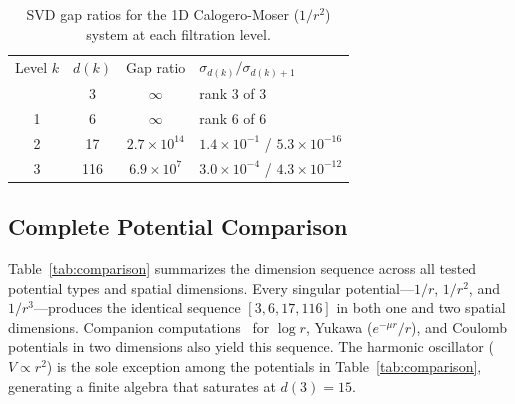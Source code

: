 \documentclass[aps,prl,twocolumn,superscriptaddress,showpacs]{revtex4-2}
\begin{document}
\begin{table}[b]
\caption{SVD gap ratios for the 1D Calogero-Moser ($1/r^2$) system
at each filtration level.}
\label{tab:gaps}
\begin{ruledtabular}
\begin{tabular}{cccl}
Level $k$ & $d(k)$ & Gap ratio & $\sigma_{d(k)} / \sigma_{d(k)+1}$ \\
\colrule
0 & 3  & $\infty$       & rank 3 of 3 \\
1 & 6  & $\infty$       & rank 6 of 6 \\
2 & 17 & $2.7 \times 10^{14}$ & $1.4 \times 10^{-1}$ / $5.3 \times 10^{-16}$ \\
3 & 116 & $6.9 \times 10^{7}$ & $3.0 \times 10^{-4}$ / $4.3 \times 10^{-12}$ \\
\end{tabular}
\end{ruledtabular}
\end{table}

\subsection{Complete Potential Comparison}

Table~\ref{tab:comparison} summarizes the dimension sequence across
all tested potential types and spatial dimensions.  Every singular
potential---$1/r$, $1/r^2$, and $1/r^3$---produces the identical
sequence $[3, 6, 17, 116]$ in both one and two spatial dimensions.
Companion computations~\cite{paper1,paper3} for $\log r$, Yukawa
($e^{-\mu r}/r$), and Coulomb potentials in two dimensions also yield
this sequence.  The harmonic oscillator ($V \propto r^2$) is the sole
exception among the potentials in Table~\ref{tab:comparison},
generating a finite algebra that saturates at $d(3) = 15$.
\end{document}
